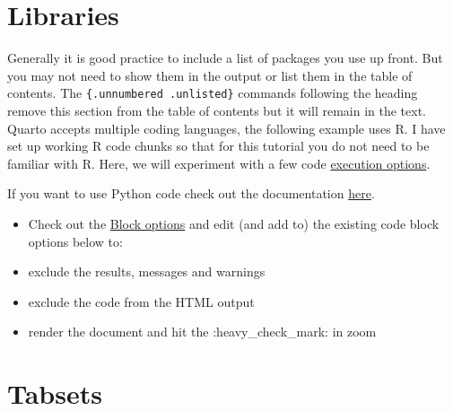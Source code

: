 \documentclass[
  letterpaper,
  DIV=11,
  numbers=noendperiod]{scrartcl}
\begin{document}
\hypertarget{libraries}{%
\section*{Libraries}\label{libraries}}

Generally it is good practice to include a list of packages you use up
front. But you may not need to show them in the output or list them in
the table of contents. The \texttt{\{.unnumbered\ .unlisted\}} commands
following the heading remove this section from the table of contents but
it will remain in the text. Quarto accepts multiple coding languages,
the following example uses R. I have set up working R code chunks so
that for this tutorial you do not need to be familiar with R. Here, we
will experiment with a few code
\href{https://quarto.org/docs/computations/execution-options.html}{execution
options}.

If you want to use Python code check out the documentation
\href{https://quarto.org/docs/computations/python.html\#overview}{here}.

\begin{tcolorbox}[enhanced jigsaw, colback=white, arc=.35mm, colframe=quarto-callout-tip-color-frame, bottomrule=.15mm, coltitle=black, rightrule=.15mm, breakable, colbacktitle=quarto-callout-tip-color!10!white, title=\textcolor{quarto-callout-tip-color}{\faLightbulb}\hspace{0.5em}{Code block exercise}, opacitybacktitle=0.6, bottomtitle=1mm, toptitle=1mm, leftrule=.75mm, left=2mm, opacityback=0, toprule=.15mm, titlerule=0mm]

\begin{itemize}
\item
  Check out the
  \href{https://quarto.org/docs/computations/execution-options.html}{Block
  options} and edit (and add to) the existing code block options below
  to:
\item
  exclude the results, messages and warnings
\item
  exclude the code from the HTML output
\item
  render the document and hit the :heavy\_check\_mark: in zoom
\end{itemize}

\end{tcolorbox}

\hypertarget{tabsets}{%
\section{Tabsets}\label{tabsets}}
\end{document}
